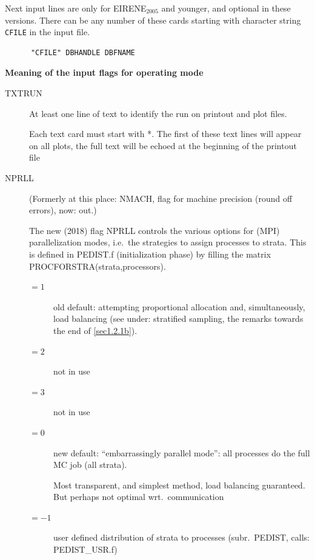 Next input lines are only for EIRENE$_{2005}
$ and younger, and optional in these versions.
There can be any number of these cards starting with character string
\lstinline|CFILE|	  in the input file.

\begin{lstlisting}
      "CFILE" DBHANDLE DBFNAME
\end{lstlisting}

\medskip

\textbf{Meaning of the input flags for operating mode}

\medskip

\begin{description}
  \item[TXTRUN] At least one line of text to identify the run
        on printout and plot files.

        Each text card must start with *.
        The first of these text lines will appear on all plots, the full text will be
        echoed at the beginning of the printout file
  \item[NPRLL] (Formerly at this
        place: NMACH, flag for machine precision (round off errors), now: out.)

        The new (2018) flag NPRLL controls the various options for (MPI)
        parallelization modes, i.e.\ the strategies to assign processes  to strata.
        This is defined in PEDIST.f (initialization phase) by filling the matrix
        PROCFORSTRA(strata,processors).
        \begin{description}
          \item[$= 1$] old default: attempting proportional allocation and,
                simultaneously, load balancing (see under: stratified sampling, the remarks
                towards the end of \cref{sec1.2.1b}).
          \item[$= 2$] not in use
          \item[$= 3$] not in use
          \item[$= 0$] new default:
                ``embarrassingly parallel mode'': all processes do the full MC job (all
                strata).

                Most transparent, and simplest method, load balancing guaranteed.
                But perhaps not optimal wrt.\ communication
          \item[$= -1$] user defined
                distribution of strata to processes (subr.\ PEDIST, calls: PEDIST\_USR.f)
        \end{description}


\end{description}
